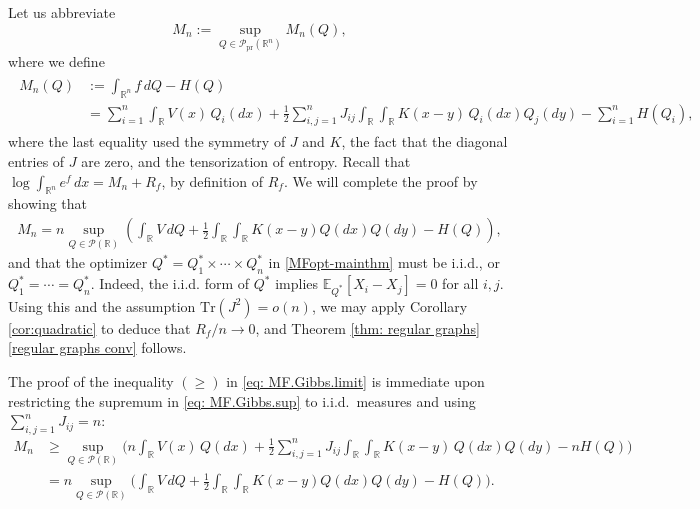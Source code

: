 \documentclass[11pt,reqno]{amsart}
\numberwithin{equation}{section}
\theoremstyle{definition}
\def\E{{\mathbb E}}
\def\R{{\mathbb R}}
\def\P{{\mathcal P}}
\def\tr{{\mathrm{Tr}}}
\def\Pprod{\P_{\mathrm{pr}}}
\begin{document}
Let us abbreviate
\begin{equation}
	M_n:=\sup_{Q \in \Pprod(\R^n)} M_n(Q), \label{eq: MF.Gibbs.sup}
\end{equation}
where we  define
\begin{align*} \begin{split}
		M_n(Q) &:=\int_{\R^n} f\,dQ - H(Q) \\
		&= \sum_{i=1}^n \int_{\R} V(x) \, Q_i(dx)  + \frac12 \sum_{i,j=1}^n J_{ij} \int_{\R} \int_{\R} K(x-y)\,Q_i(dx)Q_j(dy)  -  \sum_{i=1}^n H(Q_i), \end{split} 
\end{align*}
where the last equality used the symmetry of $J$ and $K$, the fact that the diagonal entries of $J$ are zero, and the tensorization of entropy. Recall that $\log \int_{\R^n} e^f\,dx = M_n + R_f$, by definition of $R_f$. 
We will complete the proof by showing that
\begin{align} \label{eq: MF.Gibbs.limit}
	M_n = n\sup_{Q \in \P(\R)} \left( \int_{\R} V\,dQ + \frac12 \int_{\R}\int_{\R} K(x-y)Q(dx)Q(dy) - H(Q)\right),
\end{align}
and that the optimizer $Q^*=Q^*_1 \times \cdots \times Q^*_n$ in \eqref{MFopt-mainthm} must be i.i.d., or $Q^*_1=\cdots=Q^*_n$.
Indeed, the i.i.d. form of $ Q^* $ implies $\E_{Q^*}[X_i-X_j]=0$ for all $i,j$. Using this and the assumption $\tr(J^2)=o(n)$, we may apply Corollary  \ref{cor:quadratic} to deduce that $R_f/n \to 0$, and Theorem \ref{thm: regular graphs}\eqref{regular graphs conv} follows.

The proof of the inequality $ (\ge) $ in \eqref{eq: MF.Gibbs.limit} is immediate upon restricting the supremum in \eqref{eq: MF.Gibbs.sup} to i.i.d.\ measures and using $\sum_{i,j=1}^nJ_{ij}=n$:
\begin{align*}
	M_n &\ge \sup_{Q\in\P(\R)}\bigg(  n \int_{\R} V(x) \, Q(dx) + \frac12 \sum_{i,j=1}^n J_{ij} \int_{\R} \int_{\R} K(x-y)\,Q(dx)Q(dy) - nH(Q)\bigg)\\
	& = n\sup_{Q \in \P(\R)} \bigg( \int_{\R} V\,dQ + \frac12 \int_{\R}\int_{\R} K(x-y)Q(dx)Q(dy) - H(Q)\bigg).
\end{align*}
\end{document}
